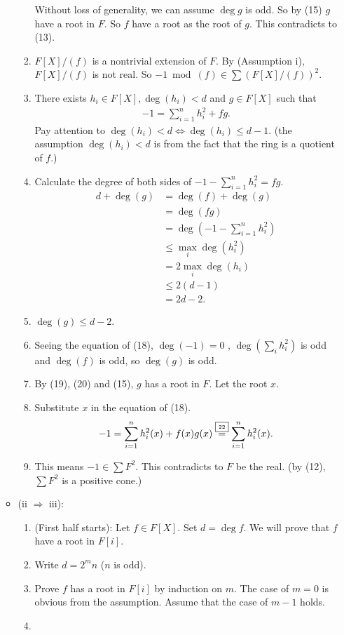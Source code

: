 \documentclass[9pt]{ltjsarticle}
\begin{document}
\begin{itemize}
\begin{itemize}
\begin{enumerate}
      Without loss of generality, we can assume $\deg g$ is odd.
      So by (15) $g$ have a root in $F$.
      So $f$ have a root as the root of $g$.
      This contradicts to (13).
      \item
      $F[X]/(f)$ is a nontrivial extension of $F$.
      By (Assumption i), $F[X]/(f)$ is not real.
      So $-1 \bmod (f) \in \sum (F[X]/(f))^2$.
      \item
      There exists $h_i \in F[X], \deg(h_i)<d$ and $g\in F[X]$ such that
      \begin{align}
        -1 = \sum_{i=1}^n h_i^2 + fg.
      \end{align}
      Pay attention to $\deg(h_i)<d \iff \deg(h_i)\le d-1$.
      (the assumption $\deg(h_i)<d$ is from the fact that the ring is a quotient of $f$.)
      \item
      Calculate the degree of both sides of $-1 - \sum_{i=1}^n h_i^2 = fg$.
      \begin{align}
        d + \deg(g)
        &=
        \deg(f) + \deg(g)\\
        &=
        \deg(fg)\\
        &=
        \deg(-1-\sum_{i=1}^n h_i^2)\\
        &\le
        \max_i\deg(h_i^2)\\
        &=
        2\max_i \deg(h_i)\\
        &\le
        2 (d-1)\\
        &=
        2d-2.
      \end{align}
      \item
      $\deg(g)\le d-2$.
      \item
      Seeing the equation of (18), $\deg(-1)=0$ , $\deg(\sum_i h_i^2)$ is odd and
      $\deg(f)$ is odd, so $\deg(g)$ is odd.
      \item
      By (19), (20) and (15), $g$ has a root in $F$.
      Let the root $x$.
      \item
      Substitute $x$ in the equation of (18).
      \begin{align}
        -1 = \sum_{i=1}^n h_i^2(x) + f(x)g(x) \overset{\text{\fbox{\tiny 22}}}{=} \sum_{i=1}^n h_i^2(x).
      \end{align}
      \item
      This means $-1 \in \sum F^2$.  This contradicts to
      $F$ be the real. (by (12), $\sum F^2$ is a positive cone.)
    \end{enumerate}
    \item
    (ii $\Rightarrow$ iii):
    \begin{enumerate}
      \item (First half starts):
      Let $f\in F[X]$. Set $d = \deg f$.
      We will prove that $f$ have a root in $F[i]$.
      \item
      Write $d=2^m n$ ($n$ is odd).
      \item
      Prove $f$ has a root in $F[i]$ by induction on $m$.
      The case of $m=0$ is obvious from the assumption.
      Assume that the case of $m-1$ holds.
      \item


\end{enumerate}
\end{itemize}
\end{itemize}
\end{document}
